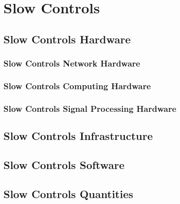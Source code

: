 \section{Slow Controls}
\label{sec:fddp-slow-cryo-ctrl}




\subsection{Slow Controls Hardware}
\label{sec:fddp-slow-cryo-hdwr}

\subsubsection{Slow Controls Network Hardware}

\subsubsection{Slow Controls Computing Hardware}

\subsubsection{Slow Controls Signal Processing Hardware}



\subsection{Slow Controls Infrastructure}
\label{sec:fddp-slow-cryo-slow-infra}

\subsection{Slow Controls Software}
\label{sec:fddp-slow-cryo-sw}

\subsection{Slow Controls Quantities}
\label{sec:fddp-slow-cryo-quant}

